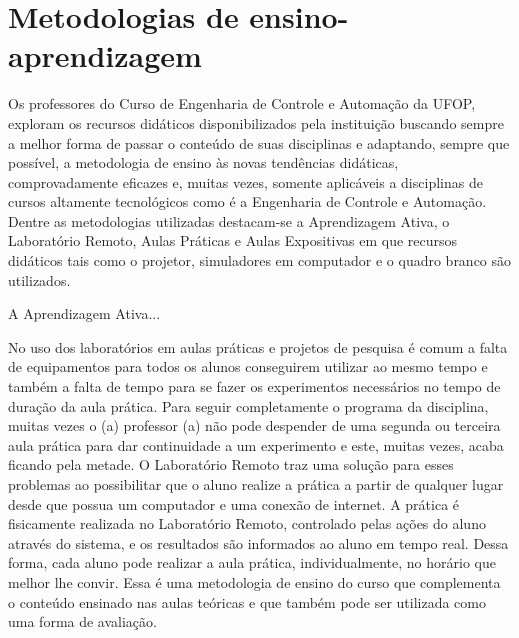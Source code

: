 \chapter{Metodologias de ensino-aprendizagem} 
\label{cap:05} 
Os professores do Curso de Engenharia de Controle e Automação da UFOP, exploram os recursos didáticos disponibilizados pela instituição buscando sempre a melhor forma de passar o conteúdo de suas disciplinas e adaptando, sempre que possível, a metodologia de ensino às novas tendências didáticas, comprovadamente eficazes e, muitas vezes, somente aplicáveis a disciplinas de cursos  altamente tecnológicos como é a Engenharia de Controle e Automação. Dentre as metodologias utilizadas destacam-se a Aprendizagem Ativa, o Laboratório Remoto, Aulas Práticas e Aulas Expositivas em que recursos didáticos tais como o projetor, simuladores em computador e o quadro branco são utilizados.   

A  Aprendizagem Ativa...

No uso dos laboratórios em aulas práticas e projetos de pesquisa é comum a falta de equipamentos para todos os alunos conseguirem utilizar ao mesmo tempo e também a falta de tempo para se fazer os experimentos necessários no tempo de duração da aula prática. Para seguir completamente o programa da disciplina, muitas vezes o (a) professor (a) não pode despender de uma segunda ou terceira aula prática para dar continuidade a um experimento e este, muitas vezes, acaba ficando pela metade. O Laboratório Remoto traz uma solução para esses problemas ao possibilitar que o aluno realize a prática a partir de qualquer lugar desde que possua um computador e uma conexão de internet. A prática é fisicamente realizada no Laboratório Remoto, controlado pelas ações do aluno através do sistema, e os resultados são informados ao aluno em tempo real. Dessa forma, cada aluno pode realizar a aula prática, individualmente, no horário que melhor lhe convir. Essa é uma metodologia de ensino do curso que complementa o conteúdo ensinado nas aulas teóricas e que também pode ser utilizada como uma forma de avaliação.
